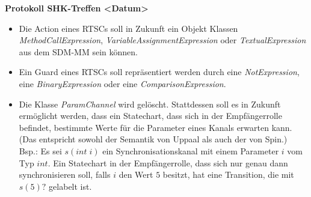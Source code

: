 \documentclass[11pt,a4paper]{article}
\begin{document}
\begin{center}

\textbf{\huge Protokoll SHK-Treffen <Datum>}\\[0.9cm]

\end{center}

\begin{itemize}
  \item Die Action eines RTSCs soll in Zukunft ein Objekt Klassen
  \emph{MethodCallExpression}, \emph{VariableAssignmentExpression} oder
  \emph{TextualExpression} aus dem SDM-MM sein können.
  \item Ein Guard eines RTSCs soll repräsentiert werden durch eine
  \emph{NotExpression}, eine \emph{BinaryExpression} oder eine
  \emph{ComparisonExpression}.
  \item Die Klasse \emph{ParamChannel} wird gelöscht. Stattdessen soll es in
  Zukunft ermöglicht werden, dass ein Statechart, dass sich in der
  Empfängerrolle befindet, bestimmte Werte für die Parameter eines Kanals
  erwarten kann. (Das entspricht sowohl der Semantik von Uppaal als auch der von
  Spin.) Bsp.: Es sei $s(int\;i)$ ein Synchronisationskanal mit einem Parameter
  $i$ vom Typ $int$. Ein Statechart in der Empfängerrolle, dass sich nur genau
  dann synchronisieren soll, falls $i$ den Wert $5$ besitzt, hat eine
  Transition, die mit $s(5)?$ gelabelt ist.
\end{itemize}
\end{document}
